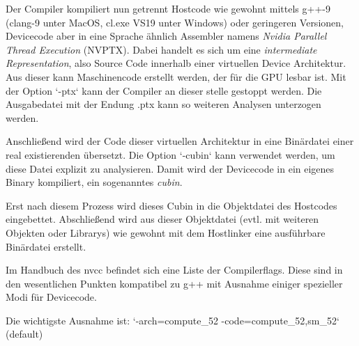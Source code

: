 			Der Compiler kompiliert nun getrennt Hostcode wie gewohnt mittels g++-9 (clang-9 unter MacOS, cl.exe VS19 unter Windows) oder geringeren Versionen, Devicecode aber in eine Sprache ähnlich Assembler namens \textit{Nvidia Parallel Thread Execution} (\Gls{NVPTX}). Dabei handelt es sich um eine \textit{intermediate Representation}, also Source Code innerhalb einer virtuellen Device Architektur. Aus dieser kann Maschinencode erstellt werden, der für die GPU lesbar ist. Mit der Option \li`-ptx` kann der Compiler an dieser stelle gestoppt werden. Die Ausgabedatei mit der Endung .ptx kann so weiteren Analysen unterzogen werden.
			
			Anschlie\ss end wird der Code dieser virtuellen Architektur in eine Binärdatei einer real existierenden übersetzt. Die Option \li`-cubin` kann verwendet werden, um diese Datei explizit zu analysieren. Damit wird der Devicecode in ein eigenes Binary kompiliert, ein sogenanntes \textit{cubin}. 
			
			Erst nach diesem Prozess wird dieses Cubin in die Objektdatei des Hostcodes eingebettet. Abschlie\ss end wird aus dieser Objektdatei (evtl. mit weiteren Objekten oder Librarys) wie gewohnt mit dem Hostlinker eine ausführbare Binärdatei erstellt.
			
			Im Handbuch des \gls{nvcc} \autocite{cudaNVCC} befindet sich eine Liste der Compilerflags. Diese sind in den wesentlichen Punkten kompatibel zu g++ mit Ausnahme einiger spezieller Modi für Devicecode.
		
			Die wichtigste Ausnahme ist: \li`-arch=compute_52 -code=compute_52,sm_52` (default)
		
